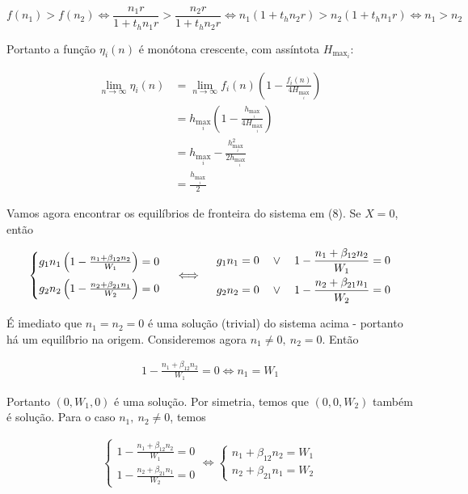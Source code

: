 \documentclass{article}
\begin{document}
\begin{equation*}
    f(n_1) > f(n_2) \iff \frac{n_1r}{1 + t_hn_1r} > \frac{n_2r}{1 + t_hn_2r} \iff n_1(1 + t_hn_2r) > n_2(1 + t_hn_1r) \iff n_1 > n_2
\end{equation*}

Portanto a função $\eta_i(n)$ é monótona crescente, com assíntota $H_{\max_i}$:

\begin{align*}
    \lim_{n \to \infty} \eta_i(n) &= \lim_{n \to \infty} f_i(n)\left(1 - \frac{f_i(n)}{4H_{\max_i}}\right) \\
                                  &= h_{\max_i}\left( 1 - \frac{h_{\max_i}}{4H_{\max_i}} \right) \\
                                  &= h_{\max_i} - \frac{h_{\max_i}^2}{2h_{\max_i}} \\
                                  &= \frac{h_{\max_i}}{2}
\end{align*}

Vamos agora encontrar os equilíbrios de fronteira do sistema em (8). Se $X = 0$, então

\begin{align*}
    \begin{cases}
    g_1 n_1 \left( 1 - \frac{n_1 + \beta_{12}n_2}{W_1} \right) = 0 \vspace{2mm} \\
    g_2 n_2 \left( 1 - \frac{n_2 + \beta_{21}n_1}{W_2} \right) = 0
    \end{cases} \iff \quad
    \begin{aligned}
    g_1 n_1 = 0 \quad \lor \quad 1 - \frac{n_1 + \beta_{12}n_2}{W_1} = 0 \\
    g_2 n_2 = 0 \quad \lor \quad 1 - \frac{n_2 + \beta_{21}n_1}{W_2} = 0
    \end{aligned}
\end{align*}

É imediato que $n_1 = n_2 = 0$ é uma solução (trivial) do sistema acima - portanto há um equilíbrio na origem. Consideremos agora $n_1 \neq 0,\:n_2 = 0$. Então

\begin{align*}
    1 - \frac{n_1 + \beta_{12}n_2}{W_1} = 0 \iff n_1 = W_1
\end{align*}

Portanto $(0,W_1,0)$ é uma solução. Por simetria, temos que $(0,0,W_2)$ também é solução. Para o caso $n_1,\:n_2 \neq 0$, temos

\begin{align*}
    \begin{cases}
    1 - \frac{n_1 + \beta_{12}n_2}{W_1} = 0 \\
    1 - \frac{n_2 + \beta_{21}n_1}{W_2} = 0
    \end{cases} \iff
    \begin{cases}
    n_1 + \beta_{12}n_2 = W_1 \\
    n_2 + \beta_{21}n_1 = W_2
    \end{cases}
\end{align*}
\end{document}
